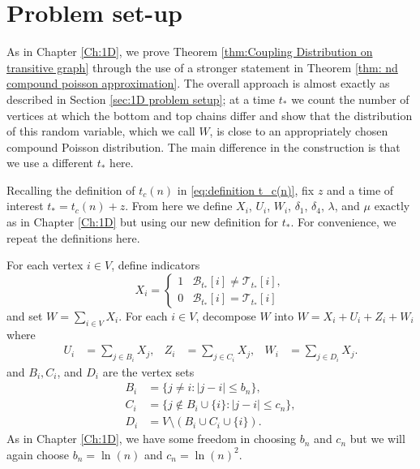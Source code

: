 \section{Problem set-up}
\label{sec:nd problem setup}
As in Chapter \ref{Ch:1D}, we prove Theorem \ref{thm:Coupling Distribution on transitive graph} through the use of a stronger statement in Theorem \ref{thm: nd compound poisson approximation}. The overall approach is almost exactly as described in Section \ref{sec:1D problem setup}; at a time $t_*$ we count the number of vertices at which the bottom and top chains differ and show that the distribution of this random variable, which we call $W$, is close to an appropriately chosen compound Poisson distribution. The main difference in the construction is that we use a different $t_*$ here.

Recalling the definition of $t_c(n)$ in \eqref{eq:definition t_c(n)}, fix $z$ and a time of interest $t_* = t_c(n) + z$. From here we define $X_i$, $U_i$, $W_i$, $\delta_1$, $\delta_4$, $\lambda$, and $\mu$ exactly as in Chapter \ref{Ch:1D} but using our new definition for $t_*$. For convenience, we repeat the definitions here.

For each vertex $i \in V$, define indicators
	\begin{equation}
		X_i = 
		\begin{cases}
			1 & \mathscr{B}_{t_*}[i] \neq \mathscr{T}_{t_*}[i],\\
			0 & \mathscr{B}_{t_*}[i] = \mathscr{T}_{t_*}[i]
		\end{cases}
	\end{equation}
	and set $W = \sum_{i \in V} X_i$.
	For each $i \in V$, decompose $W$ into $W = X_i + U_i + Z_i + W_i$ where
	\begin{align}
		U_i &= \sum_{j \in B_i} X_j, &
		Z_i &= \sum_{j \in C_i} X_j, &
		W_i &= \sum_{j \in D_i} X_j.
	\end{align}
	and $B_i, C_i$, and $D_i$ are the vertex sets
	\begin{align}
		B_i &= \{j\neq i : |j - i| \leq b_n \},\\
		C_i &= \{j\notin B_i\cup \{i\}: |j - i| \leq c_n \},\\
		D_i &= V \setminus (B_i \cup C_i \cup \{i\}).
	\end{align}
	As in Chapter \ref{Ch:1D}, we have some freedom in choosing $b_n$ and $c_n$ but we will again choose $b_n = \ln(n)$ and $c_n = \ln(n)^2$.

